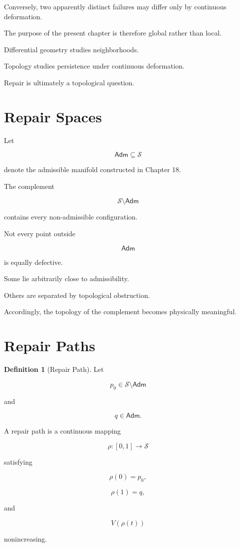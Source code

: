 \documentclass[11pt,oneside]{book}
\numberwithin{equation}{chapter}
\theoremstyle{definition}
\newtheorem{definition}{Definition}[chapter]
\theoremstyle{plain}
\newcommand{\State}{\mathcal{S}}
\newcommand{\Adm}{\mathsf{Adm}}
\begin{document}
Conversely, two apparently distinct failures may differ only by continuous
deformation.

The purpose of the present chapter is therefore global rather than local.

Differential geometry studies neighborhoods.

Topology studies persistence under continuous deformation.

Repair is ultimately a topological question.

\section{Repair Spaces}

Let

\[
\Adm
\subseteq
\State
\]

denote the admissible manifold constructed in Chapter 18.

The complement

\[
\State\setminus\Adm
\]

contains every non-admissible configuration.

Not every point outside

\[
\Adm
\]

is equally defective.

Some lie arbitrarily close to admissibility.

Others are separated by topological obstruction.

Accordingly, the topology of the complement becomes physically meaningful.

\section{Repair Paths}

\begin{definition}[Repair Path]

Let

\[
p_0
\in
\State\setminus\Adm
\]

and

\[
q
\in
\Adm.
\]

A repair path is a continuous mapping

\[
\rho :
[0,1]
\rightarrow
\State
\]

satisfying

\[
\rho(0)=p_0,
\]

\[
\rho(1)=q,
\]

and

\[
V(\rho(t))
\]

nonincreasing.

\end{definition}
\end{document}
